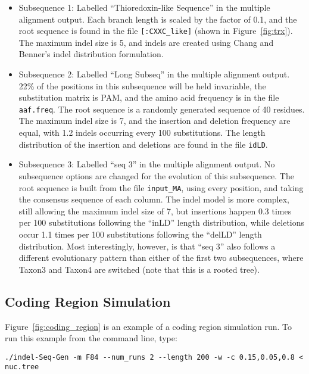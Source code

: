 \documentclass[10pt]{article}
\begin{document}
\begin{itemize}

\item[] Subsequence 1: Labelled ``Thioredoxin-like Sequence'' in the multiple alignment
output.  Each branch length is scaled by the factor of 0.1, and the root sequence is found in the file {\tt [:CXXC\_like]} (shown in Figure~\ref{fig:trx}).  The maximum indel size is 5, and indels are created using Chang and Benner's indel distribution formulation.

\item[] Subsequence 2: Labelled ``Long Subseq'' in the multiple alignment output.  22\% of the positions in this subsequence will be held invariable, the substitution matrix is PAM, and the amino acid frequency is in the file {\tt aaf.freq}.  The root sequence is a randomly generated sequence of 40 residues.  The maximum indel size is 7, and the insertion and deletion frequency are equal, with 1.2 indels occurring every 100 substitutions.  The length distribution of the insertion and deletions are found in the file {\tt idLD}.

\item[] Subsequence 3: Labelled ``seq 3'' in the multiple alignment output.  No subsequence options are changed for the evolution of this subsequence.  The root sequence is built from the file {\tt input\_MA}, using every position, and taking the consensus sequence of each column.  The indel model is more complex, still allowing the maximum indel size of 7, but insertions happen 0.3 times per 100 substitutions following the ``inLD'' length distribution, while deletions occur 1.1 times per 100 substitutions following the ``delLD'' length distribution.  Most interestingly, however, is that ``seq 3'' also follows a different evolutionary pattern than either of the first two subsequences, where Taxon3 and Taxon4 are switched (note that this is a rooted tree).

\end{itemize}

\subsection{Coding Region Simulation}
\label{sec:coding_region}
Figure~\ref{fig:coding_region} is an example of a coding region simulation run. To run this example from the command line, type:

\begin{verbatim}
./indel-Seq-Gen -m F84 --num_runs 2 --length 200 -w -c 0.15,0.05,0.8 < nuc.tree
\end{verbatim}
\end{document}
